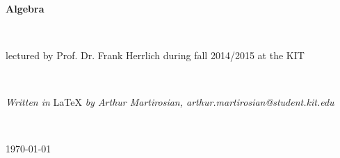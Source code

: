 \documentclass[12pt]{book}
\begin{document}
\begin{titlepage}

\textrm{ }\\[64pt]

\begin{center}
{\fontsize{40}{40} \selectfont \textbf{Algebra}}
\end{center}
\textrm{ } \\[36pt]
\begin{center} \large{\textrm{lectured by Prof. Dr. Frank Herrlich during fall 2014/2015 at the KIT}} \end{center}
\textrm{ } \\[320pt]
\begin{center} \large{\textit{Written in } \LaTeX \textit{ by Arthur Martirosian, arthur.martirosian@student.kit.edu}}\end{center}
\textrm{ }\\[24pt]
\begin{center} \large{\today} \end{center}

\end{titlepage}
\thispagestyle{empty}



\begin{spacing}{1.7}
\setcounter{tocdepth}{1}
\tableofcontents
\thispagestyle{empty}
\end{spacing}
\newpage
\end{document}

